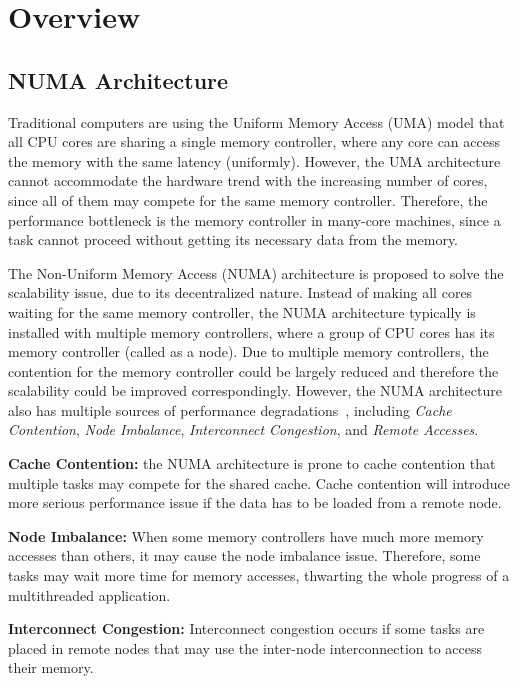 \section{Overview}

\subsection{NUMA Architecture}
\label{sec:numa}

Traditional computers are using the Uniform Memory Access (UMA) model that all CPU cores are sharing a single memory controller, where any core can access the memory with the same latency (uniformly). However, the UMA architecture cannot accommodate the hardware trend with the increasing number of cores, since all of them may compete for the same memory controller. Therefore, the performance bottleneck is the memory controller in many-core machines, since a task cannot proceed without getting its necessary data from the memory. 

The Non-Uniform Memory Access (NUMA) architecture is proposed to solve the scalability issue, due to its decentralized nature. Instead of making all cores waiting for the same memory controller, the NUMA architecture typically is installed with multiple memory controllers, where a group of CPU cores has its memory controller (called as a node). Due to multiple memory controllers, the contention for the memory controller could be largely reduced and therefore the scalability could be improved correspondingly. However, the NUMA architecture also has multiple sources of performance degradations~\cite{Blagodurov:2011:CNC:2002181.2002182}, including \textit{Cache Contention}, \textit{Node Imbalance}, \textit{Interconnect Congestion}, and \textit{Remote Accesses}. 

\textbf{Cache Contention:} the NUMA architecture is prone to cache contention that multiple tasks may compete for the shared cache. Cache contention will introduce more serious performance issue if the data has to be loaded from a remote node. 
 
\textbf{Node Imbalance:} When some memory controllers have much more memory accesses than others, it may cause the node imbalance issue. Therefore, some tasks may wait more time for memory accesses, thwarting the whole progress of a multithreaded application.  

\textbf{Interconnect Congestion:} Interconnect congestion occurs if some tasks are placed in remote nodes that may use the inter-node interconnection to access their memory. 

